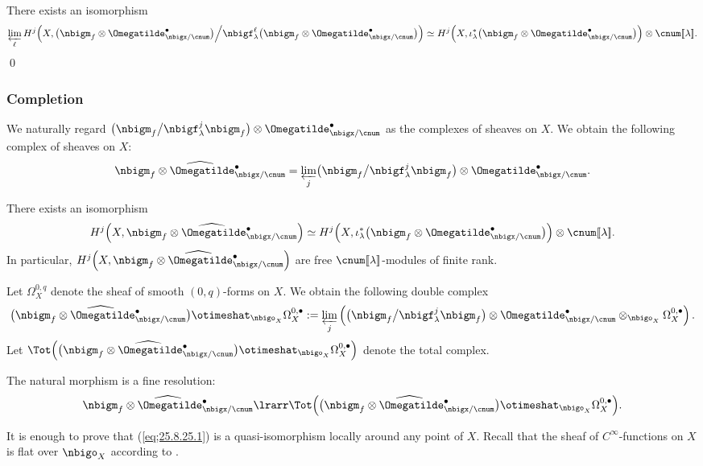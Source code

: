 \documentclass[a4,10pt]{article}
\begin{document}
\begin{cor}
There exists an isomorphism
\begin{equation}
\varprojlim_{\ell}
H^j\Bigl(
 X,
\bigl(
\nbigm_f\otimes\Omegatilde^{\bullet}_{\nbigx/\cnum}
\bigr)
\Big/
\nbigf^{\ell}_{\lambda}
\bigl(
\nbigm_f\otimes\Omegatilde^{\bullet}_{\nbigx/\cnum}
\bigr)
 \Bigr)
 \simeq
  H^j\Bigl(
 X,
 \iota_{\lambda}^{\ast}\bigl(
 \nbigm_f\otimes
 \Omegatilde^{\bullet}_{\nbigx/\cnum}
 \bigr)
 \Bigr)
\otimes
 \cnum[\![\lambda]\!].
\end{equation}
\hfill\qed
\end{cor}


\subsubsection{Completion}

We naturally regard
$\bigl(
\nbigm_f
\bigl/
\nbigf^j_{\lambda}\nbigm_f
\bigr)
\otimes\Omegatilde^{\bullet}_{\nbigx/\cnum}$
as the complexes of sheaves on $X$.
We obtain the following complex of sheaves on $X$:
\[
\widehat{\nbigm_f\otimes\Omegatilde^{\bullet}_{\nbigx/\cnum}}=
\varprojlim_j
\bigl(
\nbigm_f
\big/
\nbigf^j_{\lambda}\nbigm_f
\bigr)
\otimes\Omegatilde^{\bullet}_{\nbigx/\cnum}.
\]
\begin{cor}
\label{cor;25.7.2.1}
There exists an isomorphism
\[
H^j\Bigl(
 X,
\widehat{\nbigm_f\otimes\Omegatilde^{\bullet}_{\nbigx/\cnum}}
\Bigr)
\simeq
 H^j\Bigl(
 X,
 \iota_{\lambda}^{\ast}\bigl(
 \nbigm_f\otimes
 \Omegatilde^{\bullet}_{\nbigx/\cnum}
 \bigr)
 \Bigr)
\otimes
 \cnum[\![\lambda]\!].
\]
In particular,
$H^j\Bigl(
 X,
\widehat{\nbigm_f\otimes\Omegatilde^{\bullet}_{\nbigx/\cnum}}
\Bigr)$
are free $\cnum[\![\lambda]\!]$-modules of finite rank.
\end{cor}
\pf
Let $\Omega^{0,q}_X$
denote the sheaf of smooth $(0,q)$-forms on $X$.
We obtain the following double complex
\[
\bigl(
 \widehat{
 \nbigm_f\otimes\Omegatilde^{\bullet}_{\nbigx/\cnum}}
\bigr)
 \otimeshat_{\nbigo_X}
 \Omega^{0,\bullet}_X
 :=
\varprojlim_j
\left(
\bigl(
\nbigm_f\big/
\nbigf^j_{\lambda}\nbigm_f
\bigr)
\otimes\Omegatilde^{\bullet}_{\nbigx/\cnum}
\otimes_{\nbigo_X}
\Omega_X^{0,\bullet}
\right).
\]
Let
$\Tot\Bigl(
\bigl(
\widehat{
 \nbigm_f\otimes\Omegatilde^{\bullet}_{\nbigx/\cnum}}
\bigr)
 \otimeshat_{\nbigo_X}
 \Omega^{0,\bullet}_X\Bigr)$
 denote the total complex.
 \begin{lem}
\label{lem;25.8.25.2}
The natural morphism is a fine resolution:
\begin{equation}
\label{eq;25.8.25.1}
 \widehat{
 \nbigm_f\otimes\Omegatilde^{\bullet}_{\nbigx/\cnum}}
 \lrarr
 \Tot\Bigl(
\bigl(
 \widehat{
 \nbigm_f\otimes\Omegatilde^{\bullet}_{\nbigx/\cnum}}
\bigr)
 \otimeshat_{\nbigo_X}
 \Omega^{0,\bullet}_X\Bigr).
\end{equation}
 \end{lem}
\pf
It is enough to prove that
(\ref{eq;25.8.25.1}) is a quasi-isomorphism
locally around any point of $X$.
Recall that the sheaf of $C^{\infty}$-functions on $X$
is flat over $\nbigo_X$
according to \cite{malgrange2}.
\end{document}

